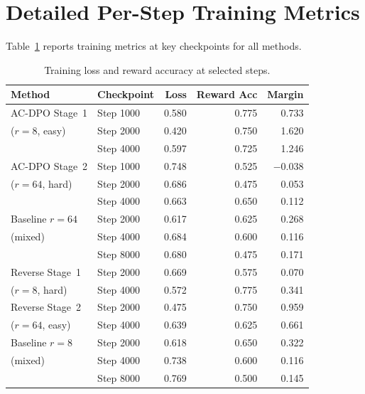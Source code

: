 \documentclass{article}
\begin{document}
\appendix

\section{Detailed Per-Step Training Metrics}

Table~\ref{tab:training_dynamics} reports training metrics at key checkpoints for all methods.

\begin{table}[ht]
\caption{Training loss and reward accuracy at selected steps.}
\label{tab:training_dynamics}
\centering
\small
\begin{tabular}{ll rrr}
\toprule
\textbf{Method} & \textbf{Checkpoint} & \textbf{Loss} & \textbf{Reward Acc} & \textbf{Margin} \\
\midrule
AC-DPO Stage~1 & Step 1000 & 0.580 & 0.775 & 0.733 \\
($r{=}8$, easy) & Step 2000 & 0.420 & 0.750 & 1.620 \\
                & Step 4000 & 0.597 & 0.725 & 1.246 \\
\midrule
AC-DPO Stage~2 & Step 1000 & 0.748 & 0.525 & $-$0.038 \\
($r{=}64$, hard) & Step 2000 & 0.686 & 0.475 & 0.053 \\
                 & Step 4000 & 0.663 & 0.650 & 0.112 \\
\midrule
Baseline $r{=}64$ & Step 2000 & 0.617 & 0.625 & 0.268 \\
(mixed)            & Step 4000 & 0.684 & 0.600 & 0.116 \\
                   & Step 8000 & 0.680 & 0.475 & 0.171 \\
\midrule
Reverse Stage~1 & Step 2000 & 0.669 & 0.575 & 0.070 \\
($r{=}8$, hard)  & Step 4000 & 0.572 & 0.775 & 0.341 \\
\midrule
Reverse Stage~2 & Step 2000 & 0.475 & 0.750 & 0.959 \\
($r{=}64$, easy) & Step 4000 & 0.639 & 0.625 & 0.661 \\
\midrule
Baseline $r{=}8$ & Step 2000 & 0.618 & 0.650 & 0.322 \\
(mixed)           & Step 4000 & 0.738 & 0.600 & 0.116 \\
                  & Step 8000 & 0.769 & 0.500 & 0.145 \\
\bottomrule
\end{tabular}
\end{table}
\end{document}
